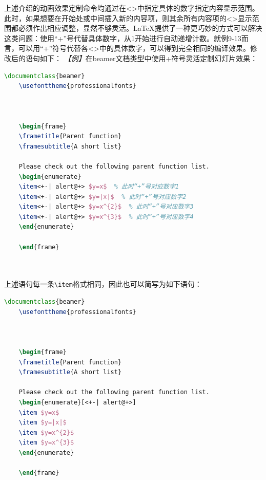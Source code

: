 上述介绍的动画效果定制命令均通过在<>中指定具体的数字指定内容显示范围。此时，如果想要在开始处或中间插入新的内容项，则其余所有内容项的<>显示范围都必须作出相应调整，显然不够灵活。LaTeX提供了一种更巧妙的方式可以解决这类问题：使用“+”号代替具体数字，从1开始进行自动递增计数。就例9-13而言，可以用“+”符号代替各<>中的具体数字，可以得到完全相同的编译效果。修改后的语句如下：
\emph{【例】}在beamer文档类型中使用+符号灵活定制幻灯片效果：
\begin{lstlisting}[language=TeX]
    \documentclass{beamer}
    \usefonttheme{professionalfonts}

    

    \begin{frame}
    \frametitle{Parent function}
    \framesubtitle{A short list}

    Please check out the following parent function list.
    \begin{enumerate}
    \item<+-| alert@+> $y=x$  % 此时“+”号对应数字1
    \item<+-| alert@+> $y=|x|$  % 此时“+”号对应数字2
    \item<+-| alert@+> $y=x^{2}$  % 此时“+”号对应数字3
    \item<+-| alert@+> $y=x^{3}$  % 此时“+”号对应数字4
    \end{enumerate}

    \end{frame}

    
\end{lstlisting}

上述语句每一条\texttt{\textbackslash{}item}格式相同，因此也可以简写为如下语句：
\begin{lstlisting}[language=TeX]
    \documentclass{beamer}
    \usefonttheme{professionalfonts}

    

    \begin{frame}
    \frametitle{Parent function}
    \framesubtitle{A short list}

    Please check out the following parent function list.
    \begin{enumerate}[<+-| alert@+>]
    \item $y=x$
    \item $y=|x|$
    \item $y=x^{2}$
    \item $y=x^{3}$
    \end{enumerate}

    \end{frame}

    
\end{lstlisting}

